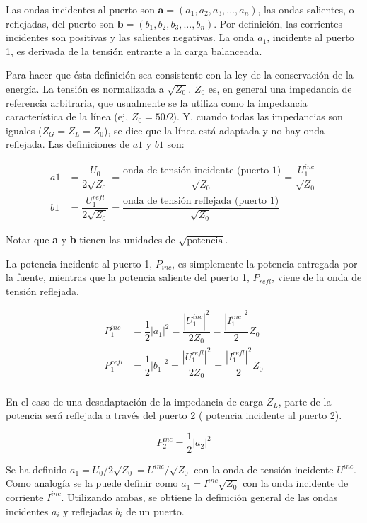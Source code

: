 Las ondas incidentes al puerto son $\textbf{a}=(a_1, a_2, a_3, ..., a_n)$, las ondas salientes, o reflejadas, del puerto son
$\textbf{b}=(b_1, b_2, b_3, ..., b_n)$. Por definición, las corrientes incidentes son positivas y las salientes negativas. La
onda $a_1$, incidente al puerto 1, es derivada de la tensión entrante a la carga balanceada.

Para hacer que ésta definición sea consistente con la ley de la conservación de la energía. La tensión es normalizada a $\sqrt{Z_0}$.
$Z_0$ es, en general una impedancia de referencia arbitraria, que usualmente se la utiliza como la impedancia característica de la
línea (ej, $Z_0 = 50 \Omega$). Y, cuando todas las impedancias son iguales ($Z_G = Z_L = Z_0$), se dice que la línea está adaptada
y no hay onda reflejada. Las definiciones de $a1$ y $b1$ son:

\begin{equation}
\begin{aligned}
	a1 &= \dfrac{U_0}{2\sqrt{Z_0}}= \dfrac{\textrm{onda de tensión incidente (puerto 1)}}{\sqrt{Z_0}}=\dfrac{U_1^{inc}}{\sqrt{Z_0}} \\
	b1 &= \dfrac{U_1^{refl}}{2\sqrt{Z_0}}= \dfrac{\textrm{onda de tensión reflejada (puerto 1)}}{\sqrt{Z_0}}
\end{aligned}
\end{equation}

Notar que \textbf{a} y \textbf{b} tienen las unidades de $\sqrt{\textrm{potencia}}$.

La potencia incidente al puerto 1, $P_{inc}$, es simplemente la potencia entregada por la fuente, mientras que la potencia saliente
del puerto 1, $P_{refl}$, viene de la onda de tensión reflejada.

\begin{equation}
\begin{aligned}
	P_1^{inc} &= \dfrac{1}{2}|a_1|^2= \dfrac{|U_1^{inc}|^2}{2Z_0}=\dfrac{|I_1^{inc}|^2}{2}Z_0 \\
	P_1^{refl} &= \dfrac{1}{2}|b_1|^2= \dfrac{|U_1^{refl}|^2}{2Z_0}=\dfrac{|I_1^{refl}|^2}{2}Z_0 \\
\end{aligned}
\end{equation}

En el caso de una desadaptación de la impedancia de carga $Z_L$, parte de la potencia será reflejada a través del puerto 2 (
potencia incidente al puerto 2).

$$
P_2^{inc}=\dfrac{1}{2}|a_2|^2
$$

Se ha definido $a_1 = U_0/2\sqrt{Z_0} = U^{inc}/\sqrt{Z_0}$ con la onda de tensión incidente $U^{inc}$. Como analogía
se la puede definir como $a_1 = I^{inc}\sqrt{Z_0}$ con la onda incidente de corriente $I^{inc}$. Utilizando ambas, se obtiene la
definición general de las ondas incidentes $a_i$ y reflejadas $b_i$ de un puerto.

